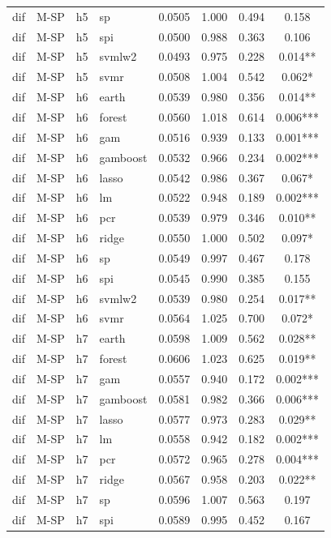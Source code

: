 \begin{ThreePartTable}
\begin{longtable}[t]{llclcccc}
dif & M-SP & h5 & sp & 0.0505 & 1.000 & 0.494 & 0.158\\
dif & M-SP & h5 & spi & 0.0500 & 0.988 & 0.363 & 0.106\\
dif & M-SP & h5 & svmlw2 & 0.0493 & 0.975 & 0.228 & 0.014**\\
dif & M-SP & h5 & svmr & 0.0508 & 1.004 & 0.542 & 0.062*\\
\addlinespace
dif & M-SP & h6 & earth & 0.0539 & 0.980 & 0.356 & 0.014**\\
dif & M-SP & h6 & forest & 0.0560 & 1.018 & 0.614 & 0.006***\\
dif & M-SP & h6 & gam & 0.0516 & 0.939 & 0.133 & 0.001***\\
dif & M-SP & h6 & gamboost & 0.0532 & 0.966 & 0.234 & 0.002***\\
dif & M-SP & h6 & lasso & 0.0542 & 0.986 & 0.367 & 0.067*\\
dif & M-SP & h6 & lm & 0.0522 & 0.948 & 0.189 & 0.002***\\
dif & M-SP & h6 & pcr & 0.0539 & 0.979 & 0.346 & 0.010**\\
dif & M-SP & h6 & ridge & 0.0550 & 1.000 & 0.502 & 0.097*\\
dif & M-SP & h6 & sp & 0.0549 & 0.997 & 0.467 & 0.178\\
dif & M-SP & h6 & spi & 0.0545 & 0.990 & 0.385 & 0.155\\
dif & M-SP & h6 & svmlw2 & 0.0539 & 0.980 & 0.254 & 0.017**\\
dif & M-SP & h6 & svmr & 0.0564 & 1.025 & 0.700 & 0.072*\\
\addlinespace
dif & M-SP & h7 & earth & 0.0598 & 1.009 & 0.562 & 0.028**\\
dif & M-SP & h7 & forest & 0.0606 & 1.023 & 0.625 & 0.019**\\
dif & M-SP & h7 & gam & 0.0557 & 0.940 & 0.172 & 0.002***\\
dif & M-SP & h7 & gamboost & 0.0581 & 0.982 & 0.366 & 0.006***\\
dif & M-SP & h7 & lasso & 0.0577 & 0.973 & 0.283 & 0.029**\\
dif & M-SP & h7 & lm & 0.0558 & 0.942 & 0.182 & 0.002***\\
dif & M-SP & h7 & pcr & 0.0572 & 0.965 & 0.278 & 0.004***\\
dif & M-SP & h7 & ridge & 0.0567 & 0.958 & 0.203 & 0.022**\\
dif & M-SP & h7 & sp & 0.0596 & 1.007 & 0.563 & 0.197\\
dif & M-SP & h7 & spi & 0.0589 & 0.995 & 0.452 & 0.167\\

\end{longtable}
\end{ThreePartTable}
